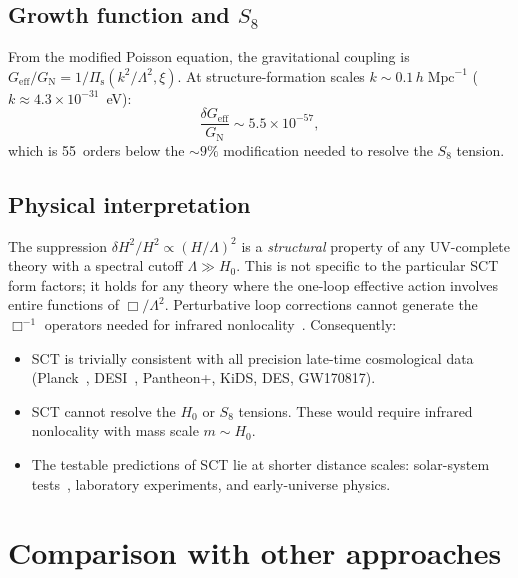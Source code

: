 \documentclass[12pt,a4paper]{article}
\newcommand{\Pis}{\Pi_{\mathrm{s}}}
\newcommand{\Lam}{\Lambda}
\theoremstyle{plain}
\theoremstyle{definition}
\begin{document}
\subsection{Growth function and \texorpdfstring{$S_8$}{S8}}

From the modified Poisson equation, the gravitational coupling is
$G_{\mathrm{eff}}/G_\mathrm{N} = 1/\Pis(k^2/\Lam^2,\xi)$.  At
structure-formation scales $k \sim 0.1\,h\;\mathrm{Mpc}^{-1}$
($k \approx 4.3 \times 10^{-31}$~eV):
\begin{equation}\label{eq:growth-mod}
  \frac{\delta G_{\mathrm{eff}}}{G_\mathrm{N}}
  \sim 5.5 \times 10^{-57},
\end{equation}
which is 55~orders below the $\sim 9\%$ modification needed to resolve the
$S_8$ tension.

\subsection{Physical interpretation}

The suppression $\delta H^2/H^2 \propto (H/\Lam)^2$ is a \emph{structural}
property of any UV-complete theory with a spectral cutoff
$\Lam \gg H_0$.  This is not specific to the particular SCT form factors;
it holds for any theory where the one-loop effective action involves entire
functions of $\Box/\Lam^2$.  Perturbative loop corrections cannot generate
the $\Box^{-1}$ operators needed for infrared nonlocality~\cite{Maggiore:2016gpx}.  Consequently:
\begin{itemize}[nosep]
  \item SCT is trivially consistent with all precision late-time
    cosmological data (Planck~\cite{Planck:2018vyg},
    DESI~\cite{DESI:2024}, Pantheon+, KiDS, DES, GW170817).
  \item SCT cannot resolve the $H_0$ or $S_8$ tensions.  These would
    require infrared nonlocality with mass scale $m \sim H_0$.
  \item The testable predictions of SCT lie at shorter distance scales:
    solar-system tests~\cite{Alfyorov:2026ss}, laboratory experiments, and
    early-universe physics.
\end{itemize}

\section{Comparison with other approaches}
\label{sec:comparison}
\end{document}
